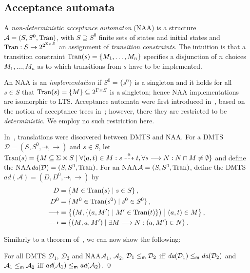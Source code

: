 \documentclass[twocolumn]{svjour3-dummy}
\newcommand*{\must}[1]{\overset{#1}{\longrightarrow}}
\newcommand*{\omust}{\mathord{\must{}}}
\newcommand*\cD{\mathcal D}
\newcommand*{\may}[1]{\overset{#1}{\dashrightarrow}}
\newcommand*{\omay}{\mathord{\may{}}}
\newcommand*\NAA{NAA\xspace}
\newcommand*\mr{\le_\textup{\textsf{m}}}
\newcommand*\noproof{\qed}
\newcommand*\cA{\mathcal A}
\newcommand*\Tran{\textup{\textrm{Tran}}}
\newcommand*\db{\textit{da}} \newcommand*\bd{\textit{ad}} \newcommand*\bigmid{\mathrel{\big|}}
\begin{document}
\subsection{Acceptance automata}

A \emph{non-deterministic acceptance automaton} (\NAA) is a structure
$\cA=( S, S^0, \Tran)$, with $S\supseteq S^0$ finite sets of states and
initial states and $\Tran: S\to 2^{ 2^{ \Sigma\times S}}$ an assignment
of \emph{transition constraints}.
The intuition is that a transition constraint $\Tran( s)=\{ M_1,\dots,
M_n\}$ specifies a disjunction of $n$ choices $M_1,\dots, M_n$ as to
which transitions from $s$ have to be implemented.

An \NAA is an \emph{implementation} if $S^0=\{ s^0\}$ is a singleton and
it holds for all $s\in S$ that $\Tran( s)=\{ M\}\subseteq 2^{
  \Gamma\times S}$ is a singleton; hence \NAA implementations are
isomorphic to LTS.
Acceptance automata were first introduced
in~\cite{report/irisa/Raclet07}, based on the notion of acceptance trees
in~\cite{DBLP:journals/jacm/Hennessy85}; however, there they are
restricted to be \emph{deterministic}.  We employ no such restriction
here.

In~\cite{DBLP:conf/concur/BenesDFKL13}, translations were discovered
between DMTS and \NAA.  For a DMTS $\cD=( S, S^0, \omay, \omust)$ and
$s\in S$, let $\Tran(s)=\{ M\subseteq \Sigma\times S\mid \forall
(a,t)\in M: s\may{a} t, \forall s\must{} N: N\cap M\ne \emptyset\}$ and
define the \NAA $\db( \cD)=( S, S^0, \Tran)$.
For an \NAA $\cA=( S, S^0, \Tran)$, define the DMTS $\bd( \cA)=( D, D^0,
\omay, \omust)$ by
\begin{align*}
  D &= \{ M\in \Tran( s)\mid s\in S\}\,, \\
  D^0 &= \{ M^0\in \Tran( s^0)\mid s^0\in S^0\}\,, \\
  \omust &= \big\{\big( M,\{( a, M')\mid M'\in \Tran(
  t)\}\big)\bigmid( a, t)\in M\big\}\,, \\
  \omay &= \{( M, a, M')\mid \exists M\must{} N: ( a, M')\in N\}\,.
\end{align*}

Similarly to a theorem of~\cite{DBLP:conf/concur/BenesDFKL13,
  DBLP:conf/ictac/FahrenbergLT14}, we can now show the following:

\begin{theorem}
  \label{th:dmtsvsaa-bool}
  For all DMTS $\cD_1$, $\cD_2$ and \NAA $\cA_1$, $\cA_2$, $\cD_1\mr
  \cD_2$ iff $\db( \cD_1)\mr \db( \cD_2)$ and $\cA_1\mr \cA_2$ iff $\bd(
  \cA_1)\mr \bd( \cA_2)$.  \noproof
\end{theorem}
\end{document}
